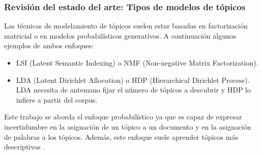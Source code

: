 \documentclass[
	spanish, %
	aspectratio=43, %
	hyperref={pdfencoding=auto,psdextra},
	xcolor={dvipsnames,table,usenames}
]{beamer}
\begin{document}
\begin{frame}

\frametitle{Revisión del estado del arte: Tipos de modelos de tópicos}
Las técnicas de modelamiento de tópicos suelen estar basadas en factorización matricial o en modelos probabilísticos generativos. A continuación algunos ejemplos de ambos enfoques:

\begin{itemize}
  \item LSI (Latent Semantic Indexing) \cite{dumais2004latent} o NMF (Non-negative Matrix Factorization)\cite{xu2003document}. 
  \item LDA (Latent Dirichlet Allocation)\cite{blei2003latent} o HDP (Hierarchical Dirichlet Process)\cite{teh2005sharing}. LDA necesita de antemano fijar el número de tópicos a descubrir y HDP lo infiere a partir del corpus.
\end{itemize} 

Este trabajo se aborda el enfoque probabilístico ya que es capaz de expresar incertidumbre en la asignación de un tópico a un documento y en la asignación de palabras a los tópicos. Además, este enfoque suele aprender tópicos más descriptivos \cite{stevens2012exploring}.\\



\end{frame}
\end{document}
